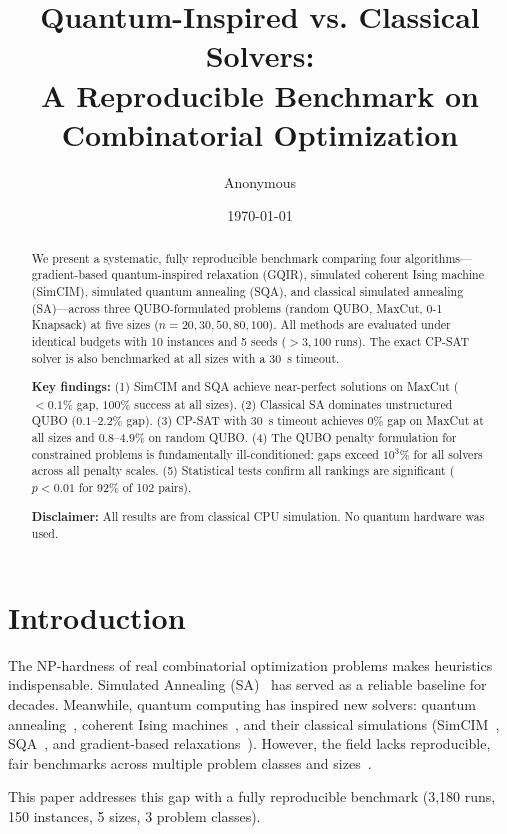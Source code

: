 \documentclass[10pt,twocolumn]{article}
\title{Quantum-Inspired vs. Classical Solvers:\\A Reproducible Benchmark on Combinatorial Optimization}
\author{Anonymous}
\date{\today}
\begin{document}
\maketitle

\begin{abstract}
We present a systematic, fully reproducible benchmark comparing four algorithms---gradient-based quantum-inspired relaxation (GQIR), simulated coherent Ising machine (SimCIM), simulated quantum annealing (SQA), and classical simulated annealing (SA)---across three QUBO-formulated problems (random QUBO, MaxCut, 0-1 Knapsack) at five sizes ($n=20,30,50,80,100$). All methods are evaluated under identical budgets with 10 instances and 5 seeds ($>3,100$ runs). The exact CP-SAT solver is also benchmarked at all sizes with a 30~s timeout.

\textbf{Key findings:} (1) SimCIM and SQA achieve near-perfect solutions on MaxCut ($<0.1\%$ gap, $100\%$ success at all sizes). (2) Classical SA dominates unstructured QUBO ($0.1$--$2.2\%$ gap). (3) CP-SAT with 30~s timeout achieves $0\%$ gap on MaxCut at all sizes and $0.8$--$4.9\%$ on random QUBO. (4) The QUBO penalty formulation for constrained problems is fundamentally ill-conditioned: gaps exceed $10^3\%$ for all solvers across all penalty scales. (5) Statistical tests confirm all rankings are significant ($p<0.01$ for $92\%$ of 102 pairs).

\textbf{Disclaimer:} All results are from classical CPU simulation. No quantum hardware was used.
\end{abstract}

\section{Introduction}
\label{sec:intro}

The NP-hardness of real combinatorial optimization problems makes heuristics indispensable. Simulated Annealing (SA)~\cite{kirkpatrick1983} has served as a reliable baseline for decades. Meanwhile, quantum computing has inspired new solvers: quantum annealing~\cite{kadowaki1998}, coherent Ising machines~\cite{yamamoto2022}, and their classical simulations (SimCIM~\cite{leleu2021}, SQA~\cite{openjij}, and gradient-based relaxations~\cite{peterson1991}). However, the field lacks reproducible, fair benchmarks across multiple problem classes and sizes~\cite{venturelli2023}.

This paper addresses this gap with a fully reproducible benchmark (3,180 runs, 150 instances, 5 sizes, 3 problem classes).
\end{document}
